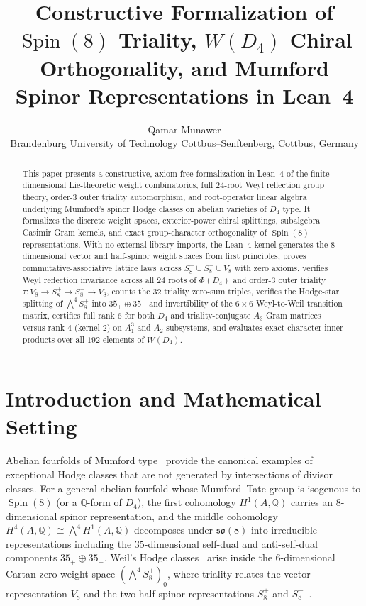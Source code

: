 \documentclass[11pt,a4paper]{article}
\title{\textbf{Constructive Formalization of \texorpdfstring{$\operatorname{Spin}(8)$}{Spin(8)} Triality, \texorpdfstring{$W(D_4)$}{W(D4)} Chiral Orthogonality, and Mumford Spinor Representations in Lean~4}}
\author{
  Qamar Munawer\\
  \small Brandenburg University of Technology Cottbus--Senftenberg, Cottbus, Germany
}
\date{}
\begin{document}
\maketitle

\begin{abstract}
This paper presents a constructive, axiom-free formalization in Lean~4 of the finite-dimensional Lie-theoretic weight combinatorics, full $24$-root Weyl reflection group theory, order-$3$ outer triality automorphism, and root-operator linear algebra underlying Mumford's spinor Hodge classes on abelian varieties of $D_4$ type. It formalizes the discrete weight spaces, exterior-power chiral splittings, subalgebra Casimir Gram kernels, and exact group-character orthogonality of $\operatorname{Spin}(8)$ representations. With no external library imports, the Lean~4 kernel generates the $8$-dimensional vector and half-spinor weight spaces from first principles, proves commutative-associative lattice laws across $S^+_8 \cup S^-_8 \cup V_8$ with zero axioms, verifies Weyl reflection invariance across all $24$ roots of $\Phi(D_4)$ and order-$3$ outer triality $\tau : V_8 \to S^+_8 \to S^-_8 \to V_8$, counts the $32$ triality zero-sum triples, verifies the Hodge-star splitting of $\bigwedge^4 S^+_8$ into $35_+ \oplus 35_-$ and invertibility of the $6 \times 6$ Weyl-to-Weil transition matrix, certifies full rank $6$ for both $D_4$ and triality-conjugate $A_3$ Gram matrices versus rank $4$ (kernel $2$) on $A_1^3$ and $A_2$ subsystems, and evaluates exact character inner products over all $192$ elements of $W(D_4)$.
\end{abstract}

\section{Introduction and Mathematical Setting}

Abelian fourfolds of Mumford type~\cite{Mumford1969,Weil1977} provide the canonical examples of exceptional Hodge classes that are not generated by intersections of divisor classes. For a general abelian fourfold whose Mumford--Tate group is isogenous to $\operatorname{Spin}(8)$ (or a $\mathbb{Q}$-form of $D_4$), the first cohomology $H^1(A, \mathbb{Q})$ carries an $8$-dimensional spinor representation, and the middle cohomology $H^4(A, \mathbb{Q}) \cong \bigwedge^4 H^1(A, \mathbb{Q})$ decomposes under $\mathfrak{so}(8)$ into irreducible representations including the $35$-dimensional self-dual and anti-self-dual components $35_+ \oplus 35_-$. Weil's Hodge classes~\cite{Weil1977,vanGeemen1994,Zarhin1984} arise inside the $6$-dimensional Cartan zero-weight space $(\bigwedge^4 S^+_8)_0$, where triality relates the vector representation $V_8$ and the two half-spinor representations $S^+_8$ and $S^-_8$~\cite{Voisin2002}.
\end{document}
